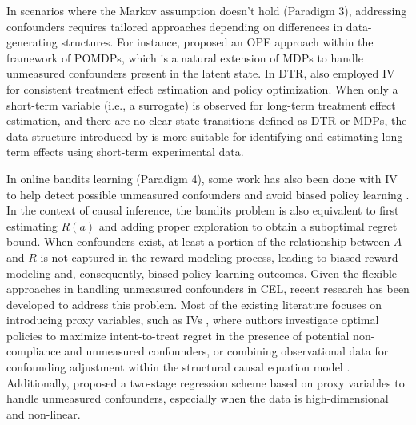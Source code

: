 In scenarios where the Markov assumption doesn't hold (Paradigm 3), addressing confounders requires tailored approaches depending on differences in data-generating structures. For instance, \citet{shi2022minimax} proposed an \acrshort{OPE} approach within the framework of \acrshort{POMDP}s, which is a natural extension of \acrshort{MDP}s to handle unmeasured confounders present in the latent state. In \acrshort{DTR}, \citet{chen2023estimating} also employed \acrshort{IV} for consistent treatment effect estimation and policy optimization. When only a short-term variable (i.e., a surrogate) is observed for long-term treatment effect estimation, and there are no clear state transitions defined as \acrshort{DTR}  or \acrshort{MDP}s, the data structure introduced by \citet{athey2020combining} is more suitable for identifying and estimating long-term effects using short-term experimental data.


In online bandits learning (Paradigm 4), some work has also been done with \acrshort{IV} to help detect possible unmeasured confounders and avoid biased policy learning \citep{sen2017contextual,kallus2018instrument,bareinboim2015bandits,xu2021deep}. %
In the context of causal inference, the bandits problem is also equivalent to first estimating $R(a)$ and adding proper exploration to obtain a suboptimal regret bound. When confounders exist, at least a portion of the relationship between $A$ and $R$ is not captured in the reward modeling process, leading to biased reward modeling and, consequently, biased policy learning outcomes. Given the flexible approaches in handling unmeasured confounders in \acrshort{CEL}, recent research has been developed to address this problem. Most of the existing literature focuses on introducing proxy variables, such as \acrshort{IV}s \citep{kallus2018instrument}, where authors investigate optimal policies to maximize intent-to-treat regret in the presence of potential non-compliance and unmeasured confounders, or combining observational data for confounding adjustment within the structural causal equation model \citep{bareinboim2015bandits}. Additionally, \citet{xu2021deep} proposed a two-stage regression scheme based on proxy variables to handle unmeasured confounders, especially when the data is high-dimensional and non-linear. 





